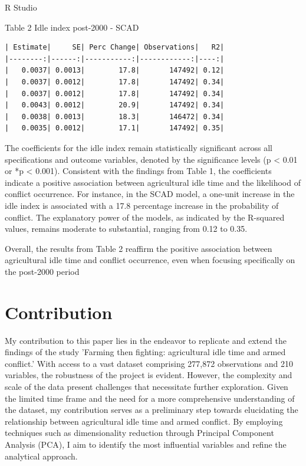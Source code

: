 \documentclass[12pt,letterpaper]{article}
\begin{document}
R Studio

Table 2 Idle index post-2000 - SCAD
\begin{verbatim}
| Estimate|     SE| Perc Change| Observations|   R2|
|--------:|------:|-----------:|------------:|----:|
|   0.0037| 0.0013|        17.8|       147492| 0.12|
|   0.0037| 0.0012|        17.8|       147492| 0.34|
|   0.0037| 0.0012|        17.8|       147492| 0.34|
|   0.0043| 0.0012|        20.9|       147492| 0.34|
|   0.0038| 0.0013|        18.3|       146472| 0.34|
|   0.0035| 0.0012|        17.1|       147492| 0.35|
\end{verbatim}

The coefficients for the idle index remain statistically significant across all specifications and outcome variables, denoted by the significance levels (p < 0.01 or *p < 0.001).
Consistent with the findings from Table 1, the coefficients indicate a positive association between agricultural idle time and the likelihood of conflict occurrence. For instance, in the SCAD model, a one-unit increase in the idle index is associated with a 17.8 percentage increase in the probability of conflict.
The explanatory power of the models, as indicated by the R-squared values, remains moderate to substantial, ranging from 0.12 to 0.35.

Overall, the results from Table 2 reaffirm the positive association between agricultural idle time and conflict occurrence, even when focusing specifically on the post-2000 period

\newpage
\section*{Contribution}

My contribution to this paper lies in the endeavor to replicate and extend the findings of the study 'Farming then fighting: agricultural idle time and armed conflict.' With access to a vast dataset comprising 277,872 observations and 210 variables, the robustness of the project is evident. However, the complexity and scale of the data present challenges that necessitate further exploration. Given the limited time frame and the need for a more comprehensive understanding of the dataset, my contribution serves as a preliminary step towards elucidating the relationship between agricultural idle time and armed conflict. By employing techniques such as dimensionality reduction through Principal Component Analysis (PCA), I aim to identify the most influential variables and refine the analytical approach. 
\end{document}
